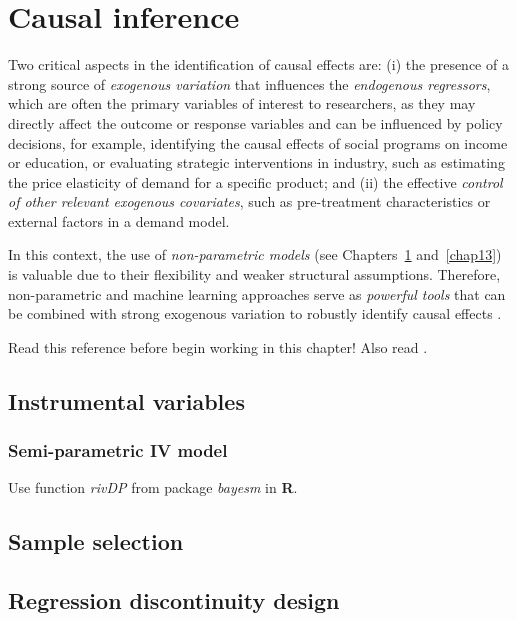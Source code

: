\chapter{Causal inference}\label{chap12}

Two critical aspects in the identification of causal effects are: (i) the presence of a strong source of \textit{exogenous variation} that influences the \textit{endogenous regressors}, which are often the primary variables of interest to researchers, as they may directly affect the outcome or response variables and can be influenced by policy decisions, for example, identifying the causal effects of social programs on income or education, or evaluating strategic interventions in industry, such as estimating the price elasticity of demand for a specific product; and (ii) the effective \textit{control of other relevant exogenous covariates}, such as pre-treatment characteristics or external factors in a demand model.

In this context, the use of \textit{non-parametric models} (see Chapters~\ref{chap12} and~\ref{chap13}) is valuable due to their flexibility and weaker structural assumptions. Therefore, non-parametric and machine learning approaches serve as \textit{powerful tools} that can be combined with strong exogenous variation to robustly identify causal effects \cite{chernozhukov2018double,chernozhukov2024applied}.


Read this reference \cite{iacovone2023bayesian} before begin working in this chapter! Also read \cite{imbens1997bayesian}.
\section{Instrumental variables}\label{sec12_1}
\subsection{Semi-parametric IV model}\label{sec12_11}
Use function \textit{rivDP} from package \textit{bayesm} in \textbf{R}.

\section{Sample selection}\label{sec12_2}
\cite{greenberg2012introduction}

\section{Regression discontinuity design}\label{sec12_3}
\cite{chib2016bayesian,chib2023nonparametric,kowalska2024bayesian}

